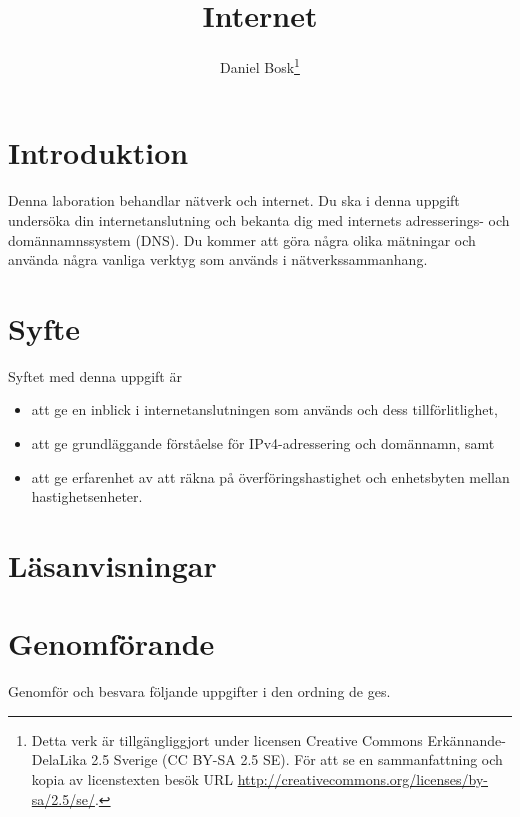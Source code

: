 \documentclass[a4paper]{miunasgn}
\title{Internet}
\author{Daniel Bosk\footnote{%
	Detta verk är tillgängliggjort under licensen Creative Commons 
	Erkännande-DelaLika 2.5 Sverige (CC BY-SA 2.5 SE).
	För att se en sammanfattning och kopia av licenstexten besök URL 
	\url{http://creativecommons.org/licenses/by-sa/2.5/se/}.
}}
\date{\svnId}
\begin{document}
\maketitle
\thispagestyle{foot}
\tableofcontents


\section{Introduktion}
\label{sec:Introduktion}
\noindent
Denna laboration behandlar nätverk och internet.
Du ska i denna uppgift undersöka din internetanslutning och bekanta dig med
internets adresserings- och domännamnssystem (DNS).
Du kommer att göra några olika mätningar och använda några vanliga verktyg som 
används i nätverkssammanhang.


\section{Syfte}
\label{sec:Syfte}
\noindent
Syftet med denna uppgift är
\begin{itemize}
		\item att ge en inblick i internetanslutningen som används och dess
		tillförlitlighet,
    \item att ge grundläggande förståelse för IPv4-adressering och domännamn,
		samt
	\item att ge erfarenhet av att räkna på överföringshastighet och
		enhetsbyten mellan hastighetsenheter.
\end{itemize}


\section{Läsanvisningar}
\label{sec:Lasanvisningar}
\noindent



\section{Genomförande}
\label{sec:Genomforande}
\noindent
Genomför och besvara följande uppgifter i den ordning de ges.
\end{document}
